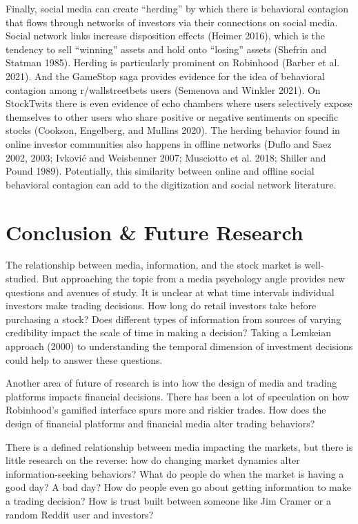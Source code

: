 \documentclass[12pt,]{article}
\begin{document}
Finally, social media can create ``herding'' by which there is
behavioral contagion that flows through networks of investors via their
connections on social media. Social network links increase disposition
effects (Heimer 2016), which is the tendency to sell ``winning'' assets
and hold onto ``losing'' assets (Shefrin and Statman 1985). Herding is
particularly prominent on Robinhood (Barber et al. 2021). And the
GameStop saga provides evidence for the idea of behavioral contagion
among r/wallstreetbets users (Semenova and Winkler 2021). On StockTwits
there is even evidence of echo chambers where users selectively expose
themselves to other users who share positive or negative sentiments on
specific stocks (Cookson, Engelberg, and Mullins 2020). The herding
behavior found in online investor communities also happens in offline
networks (Duflo and Saez 2002, 2003; Ivković and Weisbenner 2007;
Musciotto et al. 2018; Shiller and Pound 1989). Potentially, this
similarity between online and offline social behavioral contagion can
add to the digitization and social network literature.

\hypertarget{conclusion-future-research}{%
\section{Conclusion \& Future
Research}\label{conclusion-future-research}}

The relationship between media, information, and the stock market is
well-studied. But approaching the topic from a media psychology angle
provides new questions and avenues of study. It is unclear at what time
intervals individual investors make trading decisions. How long do
retail investors take before purchasing a stock? Does different types of
information from sources of varying credibility impact the scale of time
in making a decision? Taking a Lemkeian approach (2000) to understanding
the temporal dimension of investment decisions could help to answer
these questions.

Another area of future of research is into how the design of media and
trading platforms impacts financial decisions. There has been a lot of
speculation on how Robinhood's gamified interface spurs more and riskier
trades. How does the design of financial platforms and financial media
alter trading behaviors?

There is a defined relationship between media impacting the markets, but
there is little research on the reverse: how do changing market dynamics
alter information-seeking behaviors? What do people do when the market
is having a good day? A bad day? How do people even go about getting
information to make a trading decision? How is trust built between
someone like Jim Cramer or a random Reddit user and investors?
\end{document}
